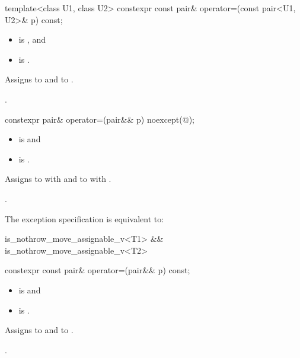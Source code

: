 %
\begin{itemdecl}
template<class U1, class U2> constexpr const pair& operator=(const pair<U1, U2>& p) const;
\end{itemdecl}

\begin{itemdescr}
\pnum
\constraints
\begin{itemize}
\item
{} is , and
\item
{} is .
\end{itemize}

\pnum
\effects
Assigns  to  and  to .

\pnum
\returns
{}.
\end{itemdescr}

%
\begin{itemdecl}
constexpr pair& operator=(pair&& p) noexcept(@\seebelow@);
\end{itemdecl}

\begin{itemdescr}
\pnum
\constraints
\begin{itemize}
\item {} is  and
\item {} is .
\end{itemize}

\pnum
\effects
Assigns to  with 
and to  with .

\pnum
\returns
{}.

\pnum
\remarks
The exception specification is equivalent to:
\begin{codeblock}
is_nothrow_move_assignable_v<T1> && is_nothrow_move_assignable_v<T2>
\end{codeblock}
\end{itemdescr}

%
\begin{itemdecl}
constexpr const pair& operator=(pair&& p) const;
\end{itemdecl}

\begin{itemdescr}
\pnum
\constraints
\begin{itemize}
\item
{} is  and
\item
{} is .
\end{itemize}

\pnum
\effects
Assigns  to  and
 to .

\pnum
\returns
{}.
\end{itemdescr}

